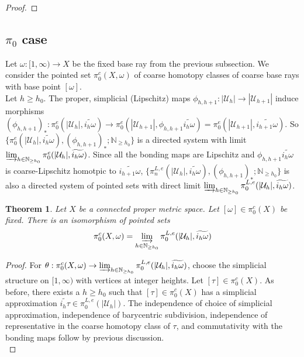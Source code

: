 \documentclass[a4paper,11pt]{article}
\theoremstyle{definition}
\theoremstyle{plain}
\newtheorem{theorem}[definition]{Theorem}
\theoremstyle{remark}
\begin{document}
{\begin{proof}
\end{proof}


\subsection{$\pi_0$ case}

Let $\omega: [1,\infty)\rightarrow X$ be the fixed base ray from the previous subsection. We consider the pointed set  $\pi_{0}^c(X,\omega)$ of coarse homotopy classes of coarse base rays with base point $[\omega]$.\\

Let $h\geq h_0$. The proper, simplicial (Lipschitz) maps $\phi_{h,h+1}: |\mathcal{U}_{h}|\rightarrow |\mathcal{U}_{h+1}|$ induce morphisms $(\phi_{h,h+1})_{\ast}: \pi_{0}^e(|\mathcal{U}_{h}|,\widetilde{i_{h}\omega})\rightarrow \pi_{0}^e(|\mathcal{U}_{h+1}|,\phi_{h,h+1}\widetilde{i_{h}\omega}) = \pi_{0}^{e}(|\mathcal{U}_{h+1}|,\widetilde{i_{h+1}\omega})$.  So $\{\pi_{0}^{e}(|\mathcal{U}_{h}|, \widetilde{i_{h}\omega}), (\phi_{h,h+1})_{\ast}; \mathbb{N}_{\geq h_0}\}$ is a directed system with limit $\varinjlim_{h\in \mathbb{N}_{\geq h_0}}\pi^{e}_{0}(|\mathcal{U}_{h}|, \widetilde{i_{h}\omega})$. Since all the bonding maps are Lipschitz and $\phi_{h,h+1}\widetilde{i_{h}\omega}$ is coarse-Lipschitz homotpic to $\widetilde{i_{h+1}\omega}$, $\{\pi_{n}^{L,e}(|\mathcal{U}_{h}|, \widetilde{i_{h}\omega}), (\phi_{h,h+1})_{\ast}; \mathbb{N}_{\geq h_0}\}$ is also a directed system of pointed sets with direct limit $\varinjlim_{h\in \mathbb{N}_{\geq h_0}}\pi^{L,e}_{0}(|\mathcal{U}_{h}|, \widetilde{i_{h}\omega})$. 




\begin{theorem} Let $X$ be a connected proper metric space. Let $[\omega]\in \pi_{0}^{c}(X)$ be fixed. There is an isomorphism of pointed sets
\begin{align*}
 \pi_{0}^c(X,\omega)= \varinjlim_{h\in \mathbb{N}_{\geq h_0}} \pi^{L,e}_{0}(|\mathcal{U}_{h}|,\widetilde{i_{h}\omega}) 
\end{align*}
\end{theorem}


\begin{proof}  For $\theta:  \pi_{0}^c(X,\omega)\rightarrow \varinjlim_{h\in \mathbb{N}_{\geq h_0}} \pi^{L,e}_{0}(|\mathcal{U}_{h}|,\widetilde{i_{h}\omega})$, choose the simplicial structure on $[1,\infty)$ with vertices at integer heights. Let $[\tau]\in \pi_{0}^{c}(X)$. As before, there exists a $h\geq h_{0}$ such that $[\tau]\in \pi_0^c(X)$ has a simplicial approximation $\widetilde{i_{h}\tau}\in \pi_0^{L,e}(|\mathcal{U}_{h}|)$. The independence of choice of simplicial approximation, independence of barycentric subdivision, independence of representative in the coarse homotopy class of $\tau$, and commutativity with the bonding maps follow by previous discussion.\\


\end{proof}}
\end{document}
